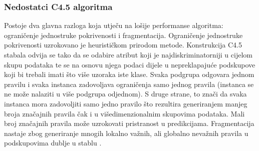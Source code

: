 \subsubsection{Nedostatci C4.5 algoritma}
Postoje dva glavna razloga koja utječu na lošije performanse algoritma: ograničenje jednostruke pokrivenosti i fragmentacija. Ograničenje jednostruke pokrivenosti uzrokovano je heurističkom prirodom metode. Konstrukcija C4.5 stabala odvija se tako da se odabire atribut koji je najdiskriminatorniji u cijelom skupu podataka te se na osnovu njega podaci dijele u nepreklapajuće podskupove koji bi trebali imati što više uzoraka iste klase. Svaka podgrupa odgovara jednom pravilu i svaka instanca zadovoljava ograničenja samo jednog pravila (instanca se ne može nalaziti u više podgrupa odjednom). S druge strane, to znači da svaka instanca mora zadovoljiti samo jedno pravilo što rezultira generiranjem manjeg broja značajnih pravila čak i u višedimenzionalnim skupovima podataka. Mali broj značajnih pravila može uzrokovati pristranost u predikcijama. Fragmentacija nastaje zbog generiranje mnogih lokalno važnih, ali globalno nevažnih pravila u podskupovima dublje u stablu \cite{Li01}.
